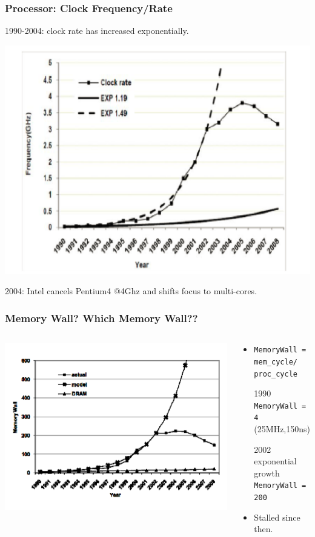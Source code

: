 \documentclass{beamer}
\begin{document}
\begin{frame}[fragile,t]
\frametitle{Processor: Clock Frequency/Rate}

1990-2004: clock rate has increased exponentially.

\includegraphics[width=47ex]{Figures/L1/FreqGraph}

2004: Intel cancels Pentium4 @4Ghz and shifts focus to multi-cores.

\end{frame}


\begin{frame}[fragile,t]
\frametitle{Memory Wall? Which Memory Wall??}

\begin{columns}
\includegraphics[width=50ex]{Figures/L1/MemWall}
\begin{scriptsize}
\begin{itemize}
\item {\tt MemoryWall = mem\_cycle/ proc\_cycle} \smallskip
\item[1990] {\tt MemoryWall = 4} (25MHz,150ns)
\item[2002] exponential growth {\tt MemoryWall = 200} 
\item Stalled since then.
\end{itemize}
\end{scriptsize}
\end{columns}

\end{frame}
\end{document}
